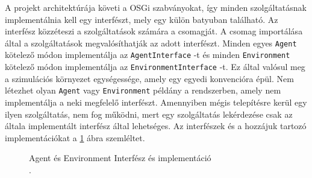 	A projekt architektúrája követi a OSGi szabványokat, így minden szolgáltatásnak implementálnia kell egy interfészt, mely egy külön batyuban található. Az interfész közzéteszi a szolgáltatások számára a csomagját. A csomag importálása által a szolgáltatások megvalósíthatják az adott interfészt. Minden egyes \texttt{Agent} kötelező módon implementálja az \texttt{AgentInterface} -t és minden \texttt{Environment} kötelező módon implementálja az \texttt{EnvironmentInterface} -t. Ez által valósul meg a szimulációs környezet egységessége, amely egy egyedi konvencióra épül. Nem létezhet olyan \texttt{Agent} vagy \texttt{Environment} példány a rendszerben, amely nem implementálja a neki megfelelő interfészt. Amennyiben mégis telepítésre kerül egy ilyen szolgáltatás, nem fog működni, mert egy szolgáltatás lekérdezése csak az általa implementált interfész által lehetséges. Az interfészek és a hozzájuk tartozó implementációkat a \ref{fig:alapUML} ábra szemléltet.

\begin{figure}[h]
  \centering
  \caption[Példa képek beszúrására]%
  {Agent és Environment Interfész és implementáció\\
  {\white .}\hfill\url{}}
  \label{fig:alapUML}
\end{figure}


